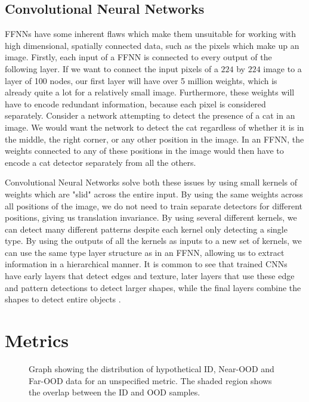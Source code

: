 \documentclass[UKenglish]{uiomasterthesis} %
\theoremstyle{definition}
\begin{document}
\subsection{Convolutional Neural Networks}

FFNNs have some inherent flaws which make them unsuitable for working with high dimensional, spatially connected data, such as the pixels which make up an image. Firstly, each input of a FFNN is connected to every output of the following layer. If we want to connect the input pixels of a $224$ by $224$ image to a layer of 100 nodes, our first layer will have over 5 million weights, which is already quite a lot for a relatively small image. Furthermore, these weights will have to encode redundant information, because each pixel is considered separately. Consider a network attempting to detect the presence of a cat in an image. We would want the network to detect the cat regardless of whether it is in the middle, the right corner, or any other position in the image. In an FFNN, the weights connected to any of these positions in the image would then have to encode a cat detector separately from all the others.

Convolutional Neural Networks solve both these issues by using small kernels of weights which are "slid" across the entire input. By using the same weights across all positions of the image, we do not need to train separate detectors for different positions, giving us translation invariance. By using several different kernels, we can detect many different patterns despite each kernel only detecting a single type. By using the outputs of all the kernels as inputs to a new set of kernels, we can use the same type layer structure as in an FFNN, allowing us to extract information in a hierarchical manner. It is common to see that trained CNNs have early layers that detect edges and texture, later layers that use these edge and pattern detections to detect larger shapes, while the final layers combine the shapes to detect entire objects \cite{lenet5}.

\section{Metrics}

\begin{figure}
    \label{fig:auroc}
    \begin{center}
        
    \end{center}
    \caption[Hypothetical ID/OOD distributions for an OOD detection metric]{Graph showing the distribution of hypothetical ID, Near-OOD and Far-OOD data for an unspecified metric. The shaded region shows the overlap between the ID and OOD samples.}
\end{figure}
\end{document}
